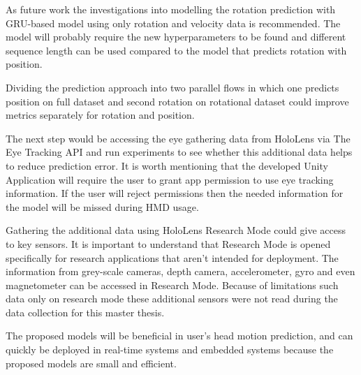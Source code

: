 As future work the investigations into modelling the rotation prediction with GRU-based model using only rotation and velocity data is recommended. The model will probably require the new hyperparameters to be found and different sequence length can be used compared to the model that predicts rotation with position. 

Dividing the prediction approach into two parallel flows in which one predicts position on full dataset and second rotation on rotational dataset could improve metrics separately for rotation and position. 

The next step would be accessing the eye gathering data from HoloLens via The Eye Tracking API and run experiments to see whether this additional data helps to reduce prediction error. It is worth mentioning that the developed Unity Application will require the user to grant app permission to use eye tracking information. If the user will reject permissions then the needed information for the model will be missed during HMD usage. 

Gathering the additional data using HoloLens Research Mode could give access to key sensors. It is important to understand that Research Mode is opened specifically for research applications that aren't intended for deployment. The information from grey-scale cameras, depth camera, accelerometer, gyro and even magnetometer can be accessed in Research Mode. Because of limitations such data only on research mode these additional sensors were not read during the data collection for this master thesis. 

The proposed models will be beneficial in user's head motion prediction, and can quickly be deployed in real-time systems and embedded systems because the proposed models are small and efficient.
